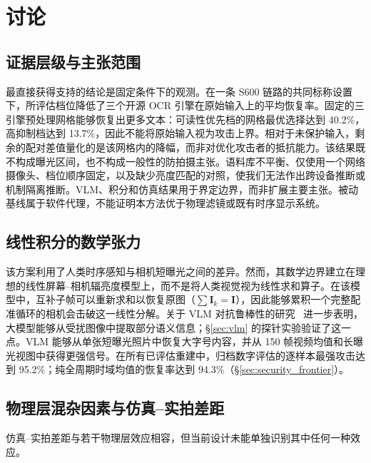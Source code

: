 \documentclass{ieeeaccess}
\begin{document}

\section{讨论}
\label{sec:discussion}

\subsection{证据层级与主张范围}

最直接获得支持的结论是固定条件下的观测。在一条 S600 链路的共同标称设置下，所评估档位降低了三个开源 OCR 引擎在原始输入上的平均恢复率。固定的三引擎预处理网格能够恢复出更多文本：可读性优先档的网格最优选择达到 40.2\%，高抑制档达到 13.7\%，因此不能将原始输入视为攻击上界。相对于未保护输入，剩余的配对差值量化的是该网格内的降幅，而非对优化攻击者的抵抗能力。该结果既不构成曝光区间，也不构成一般性的防拍摄主张。语料库不平衡、仅使用一个网络摄像头、档位顺序固定，以及缺少亮度匹配的对照，使我们无法作出跨设备推断或机制隔离推断。VLM、积分和仿真结果用于界定边界，而非扩展主要主张。被动基线属于软件代理，不能证明本方法优于物理滤镜或既有时序显示系统。

\subsection{线性积分的数学张力}

该方案利用了人类时序感知与相机短曝光之间的差异。然而，其数学边界建立在理想的线性屏幕--相机辐亮度模型上，而不是将人类视觉视为线性求和算子。在该模型中，互补子帧可以重新求和以恢复原图（$\sum\mathbf{I}_k = \mathbf{I}$），因此能够累积一个完整配准循环的相机会击破这一线性分解。关于 VLM 对抗鲁棒性的研究~\cite{b_jiang2025} 进一步表明，大模型能够从受扰图像中提取部分语义信息；\S\ref{sec:vlm} 的探针实验验证了这一点。VLM 能够从单张短曝光照片中恢复大字号内容，并从 150 帧视频均值和长曝光视图中获得更强信号。在所有已评估重建中，归档数字评估的逐样本最强攻击达到 95.2\%；纯全周期时域均值的恢复率达到 94.3\%（\S\ref{sec:security_frontier}）。

\subsection{物理层混杂因素与仿真--实拍差距}

仿真--实拍差距与若干物理层效应相容，但当前设计未能单独识别其中任何一种效应。
\end{document}
